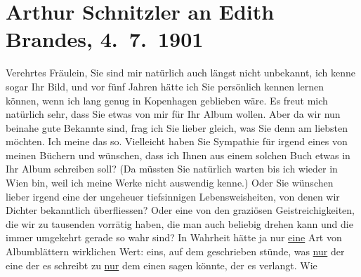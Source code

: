 

         
         \renewcommand{\erwaehntePersonen}{Personen: Georg Brandes, Edith Philipp}
         \renewcommand{\erwaehnteOrte}{Orte: Kopenhagen, St. Anton am Arlberg, Wien}
         \renewcommand{\erwaehnteWerke}{}
               \section[Arthur Schnitzler an Edith Brandes, 4. 7. 1901]{ Arthur Schnitzler an Edith Brandes, 4. 7. 1901}\nopagebreak{}\rehead{ }\begin{ledgroupsized}[t]{13cm}\normalsize\beginnumbering \toendnotes[C]{\smallbreak\pagebreak[2]} 
\toendnotes[C]{\smallbreak}\pstart{}{\pb}Verehrtes Fräulein,\pend\pstart
           Sie sind mir natürlich auch längst nicht unbekannt, ich kenne sogar Ihr Bild, und
                    vor fünf Jahren hätte ich Sie persönlich kennen lernen können, wenn ich lang
                    genug in Kopenhagen geblieben wäre. Es freut
                    mich natürlich sehr, dass Sie etwas von mir für Ihr Album wollen. Aber da wir
                    nun beinahe gute Bekannte sind, frag ich Sie lieber gleich, was Sie denn am
                    liebsten möchten. Ich meine das so. Vielleicht haben Sie Sympathie für irgend
                    eines von meinen Büchern und wünschen, dass ich Ihnen aus einem solchen Buch
                    etwas in Ihr Album schreiben soll? (Da müssten Sie natürlich warten bis ich
                    wieder in Wien bin, weil ich meine Werke nicht
                    auswendig kenne.) Oder Sie wünschen lieber irgend eine der ungeheuer
                    tiefsinnigen Lebensweisheiten, von denen wir Dichter bekanntlich überfliessen?
                    Oder eine von den graziösen Geistreichigkeiten, die wir zu tausenden vorrätig
                    haben, die man auch beliebig drehen kann und die immer umgekehrt gerade so wahr
                    sind? In Wahrheit hätte ja nur \uline{eine} Art von
                    Albumblättern wirklichen Wert: eins, auf dem geschrieben stünde, was \uline{nur} der eine der es schreibt zu \uline{nur} dem einen sagen könnte, der es verlangt. Wie

\end{ledgroupsized}
